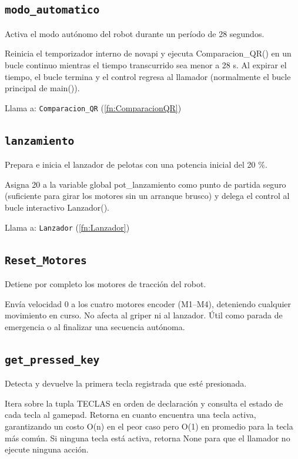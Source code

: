 \subsection{\texttt{modo\_automatico}}
\label{fn:modoautomatico}
Activa el modo autónomo del robot durante un período de 28 segundos.

Reinicia el temporizador interno de novapi y ejecuta Comparacion\_QR() en un bucle continuo mientras el tiempo transcurrido sea menor a 28 s. Al expirar el tiempo, el bucle termina y el control regresa al llamador (normalmente el bucle principal de main()).

Llama a: \texttt{Comparacion\_QR} (\ref{fn:ComparacionQR})\\

\subsection{\texttt{lanzamiento}}
\label{fn:lanzamiento}
Prepara e inicia el lanzador de pelotas con una potencia inicial del 20 \%.

Asigna 20 a la variable global pot\_lanzamiento como punto de partida seguro (suficiente para girar los motores sin un arranque brusco) y delega el control al bucle interactivo Lanzador().

Llama a: \texttt{Lanzador} (\ref{fn:Lanzador})\\

\subsection{\texttt{Reset\_Motores}}
\label{fn:ResetMotores}
Detiene por completo los motores de tracción del robot.

Envía velocidad 0 a los cuatro motores encoder (M1–M4), deteniendo cualquier movimiento en curso. No afecta al griper ni al lanzador. Útil como parada de emergencia o al finalizar una secuencia autónoma.


\subsection{\texttt{get\_pressed\_key}}
\label{fn:getpressedkey}
Detecta y devuelve la primera tecla registrada que esté presionada.

Itera sobre la tupla TECLAS en orden de declaración y consulta el estado de cada tecla al gamepad. Retorna en cuanto encuentra una tecla activa, garantizando un costo O(n) en el peor caso pero O(1) en promedio para la tecla más común. Si ninguna tecla está activa, retorna None para que el llamador no ejecute ninguna acción.

